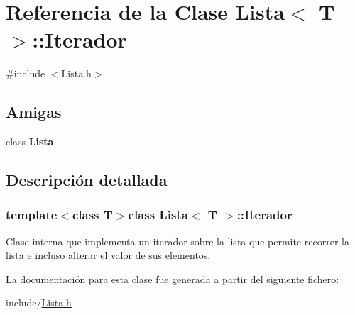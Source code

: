 \hypertarget{class_lista_1_1_iterador}{
\section{\-Referencia de la \-Clase \-Lista$<$ \-T $>$\-:\-:\-Iterador}
\label{class_lista_1_1_iterador}
}


{\ttfamily \#include $<$\-Lista.\-h$>$}

\subsection*{\-Amigas}
\begin{DoxyCompactItemize}
\item 
\hypertarget{class_lista_1_1_iterador_ae4fecdd4873df780beac2cef64580e88}{
class {\bfseries \-Lista}}
\label{class_lista_1_1_iterador_ae4fecdd4873df780beac2cef64580e88}

\end{DoxyCompactItemize}


\subsection{\-Descripción detallada}
\subsubsection*{template$<$class T$>$class Lista$<$ T $>$\-::\-Iterador}

\-Clase interna que implementa un iterador sobre la lista que permite recorrer la lista e incluso alterar el valor de sus elementos. 

\-La documentación para esta clase fue generada a partir del siguiente fichero\-:\begin{DoxyCompactItemize}
\item 
include/\hyperlink{_lista_8h}{\-Lista.\-h}\end{DoxyCompactItemize}
